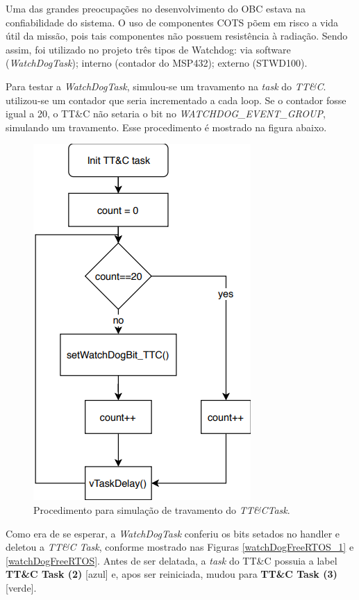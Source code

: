 Uma das grandes preocupações no desenvolvimento do OBC estava na confiabilidade do sistema. O uso de componentes COTS põem em risco a vida útil da missão, pois tais componentes não possuem resistência à radiação. Sendo assim, foi utilizado no projeto três tipos de Watchdog: via software (\textit{WatchDogTask}); interno (contador do MSP432); externo (STWD100).

Para testar a \textit{WatchDogTask}, simulou-se um travamento na \textit{task} do \textit{TT\&C}. utilizou-se um contador que seria incrementado a cada loop. Se o contador fosse igual a 20, o TT\&C não setaria o bit no \textit{WATCHDOG\_EVENT\_GROUP}, simulando um travamento. Esse procedimento é mostrado na figura abaixo.  

\begin{figure}[h]
	\centering

	\includegraphics[keepaspectratio=true,scale=0.63]{figuras/workflow_test_WTD.PNG}
	\caption{Procedimento para simulação de travamento do \textit{TT\&CTask}.}	
	\label{watchDogFreeRTOS_0}
\end{figure}
\FloatBarrier

Como era de se esperar, a \textit{WatchDogTask} conferiu os bits setados no handler e deletou a \textit{TT\&C Task}, conforme mostrado nas Figuras \ref{watchDogFreeRTOS_1} e \ref{watchDogFreeRTOS}. Antes de ser delatada, a \textit{task} do TT\&C possuia a label  \textbf{TT\&C Task (2)} [azul] e, apos ser reiniciada, mudou para \textbf{TT\&C Task (3)} [verde].

